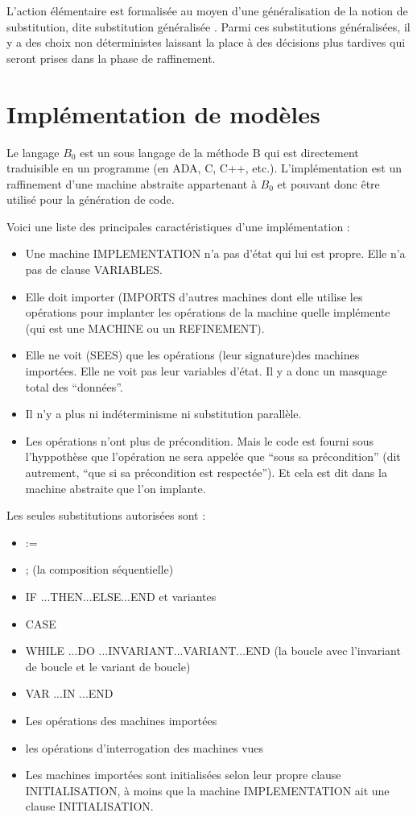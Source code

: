 \documentclass[10pt,a4paper]{article}
\begin{document}
L’action élémentaire est formalisée au moyen d’une généralisation de la notion de substitution, dite \og substitution généralisée \fg. Parmi ces substitutions généralisées,
il y a des choix non déterministes laissant la place à des décisions plus tardives qui seront prises dans la phase de raffinement.

\section{Implémentation de modèles}

Le langage $B_0$ est un sous langage de la méthode B qui est directement traduisible en un programme (en ADA, C, C++, etc.).
L'implémentation est un raffinement d'une machine abstraite appartenant à $B_0$ et pouvant donc être utilisé pour la génération de code.

Voici une liste des principales caractéristiques d'une implémentation :
\begin{itemize}
\item Une machine IMPLEMENTATION n’a pas d’état qui lui est propre. Elle n’a pas de clause VARIABLES.
\item Elle doit importer (IMPORTS d’autres machines dont elle utilise les opérations pour implanter les opérations de la machine quelle implémente (qui est une MACHINE ou un REFINEMENT). 
\item Elle ne voit (SEES) que les opérations (leur signature)des machines importées. Elle ne voit pas leur variables d’état. Il y a donc un masquage total des “données”. 
\item Il n’y a plus ni indéterminisme ni substitution parallèle.
\item Les opérations n’ont plus de précondition. Mais le code est fourni sous l’hyppothèse que l’opération ne sera appelée que “sous sa précondition” (dit autrement, “que si sa précondition est respectée”). Et cela est dit dans la machine abstraite que l’on implante.
\end{itemize}

Les seules substitutions autorisées sont :
\begin{itemize}
\item :=
\item ; (la composition séquentielle)
\item IF ...THEN...ELSE...END et variantes
\item CASE
\item WHILE ...DO ...INVARIANT...VARIANT...END (la boucle avec l’invariant de boucle et le variant de boucle)
\item VAR ...IN ...END
\item Les opérations des machines importées
\item les opérations d’interrogation des machines vues
\item Les machines importées sont initialisées selon leur propre clause INITIALISATION, à moins que la machine IMPLEMENTATION ait une clause INITIALISATION.
\end{itemize}
\end{document}
